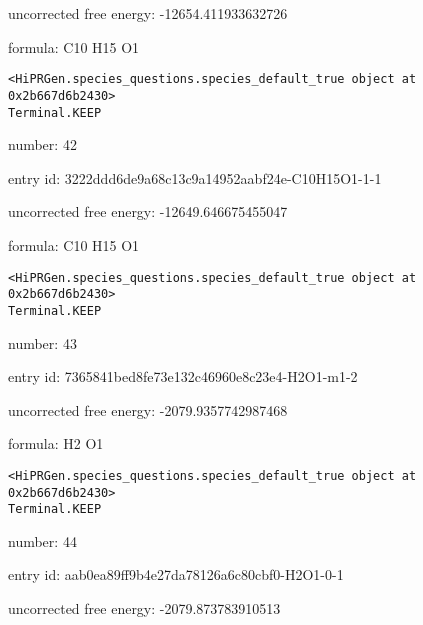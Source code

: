 \documentclass{article}
\begin{document}
uncorrected free energy: -12654.411933632726



formula: C10 H15 O1


\vspace{1cm}
\begin{verbatim}
<HiPRGen.species_questions.species_default_true object at 0x2b667d6b2430>
Terminal.KEEP
\end{verbatim}


number: 42



entry id: 3222ddd6de9a68c13c9a14952aabf24e-C10H15O1-1-1



uncorrected free energy: -12649.646675455047



formula: C10 H15 O1


\vspace{1cm}
\begin{verbatim}
<HiPRGen.species_questions.species_default_true object at 0x2b667d6b2430>
Terminal.KEEP
\end{verbatim}


number: 43



entry id: 7365841bed8fe73e132c46960e8c23e4-H2O1-m1-2



uncorrected free energy: -2079.9357742987468



formula: H2 O1


\vspace{1cm}
\begin{verbatim}
<HiPRGen.species_questions.species_default_true object at 0x2b667d6b2430>
Terminal.KEEP
\end{verbatim}


number: 44



entry id: aab0ea89ff9b4e27da78126a6c80cbf0-H2O1-0-1



uncorrected free energy: -2079.873783910513
\end{document}
